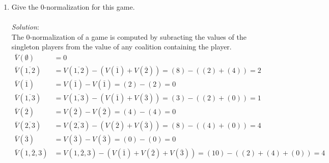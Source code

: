 \documentclass{article}
\begin{document}
\begin{enumerate}
\begin{enumerate}
    \item Give the 0-normalization for this game. \\\\
    \textit{Solution}:\\
    The 0-normalization of a game is computed by subracting the values of the singleton players from the value of any coalition containing the player. \\
    \begin{align*}
    \bar{V}(\emptyset)           &=  0                                                                                                             \\
    \bar{V}(\overline{1, 2})     &=  V(\overline{1, 2}) - (V(\overline{1}) + V(\overline{2})) = (8) - ((2) + (4)) = 2                              \\
    \bar{V}(\overline{1})        &=  V(\overline{1}) - V(\overline{1}) = (2) - (2) = 0                                                             \\
    \bar{V}(\overline{1, 3})     &=  V(\overline{1, 3}) - (V(\overline{1}) + V(\overline{3})) = (3) - ((2) + (0)) = 1                              \\
    \bar{V}(\overline{2})        &=  V(\overline{2}) - V(\overline{2}) = (4) - (4) = 0                                                             \\
    \bar{V}(\overline{2, 3})     &=  V(\overline{2, 3}) - (V(\overline{2}) + V(\overline{3})) = (8) - ((4) + (0)) = 4                              \\
    \bar{V}(\overline{3})        &=  V(\overline{3}) - V(\overline{3}) = (0) - (0) = 0                                                             \\
    \bar{V}(\overline{1, 2, 3})  &=  V(\overline{1, 2, 3}) - (V(\overline{1}) + V(\overline{2}) + V(\overline{3})) = (10) - ((2) + (4) + (0)) = 4  \\
    \end{align*}


\end{enumerate}
\end{enumerate}
\end{document}
